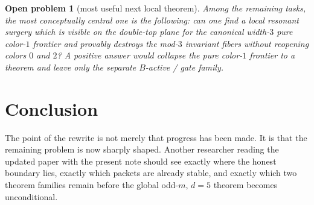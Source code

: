 \documentclass[11pt]{article}
\newtheorem{question}[theorem]{Open problem}
\begin{document}
\begin{question}[most useful next local theorem]
Among the remaining tasks, the most conceptually central one is the following:
can one find a local resonant surgery which is visible on the double-top plane
for the canonical width-$3$ pure color-$1$ frontier and provably destroys the
mod-$3$ invariant fibers without reopening colors $0$ and $2$?
A positive answer would collapse the pure color-$1$ frontier to a theorem and
leave only the separate $B$-active / gate family.
\end{question}

\section*{Conclusion}

The point of the rewrite is not merely that progress has been made.
It is that the remaining problem is now sharply shaped.
Another researcher reading the updated paper with the present note should see
exactly where the honest boundary lies, exactly which packets are already
stable, and exactly which two theorem families remain before the global odd-$m$,
$d=5$ theorem becomes unconditional.
\end{document}
